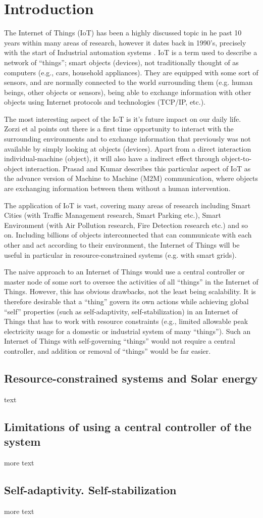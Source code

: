 \documentclass[../main/Self-Stabilization.tex]{subfiles}
\begin{document}
\section{Introduction}
The Internet of Things (IoT) has been a highly discussed topic in he past 10 years within many areas of research, however it dates back in 1990's, precisely with the start of Industrial automation systems \cite{prasad2012energy}. IoT is a term used to describe a network of ``things''; smart objects (devices), not traditionally thought of as computers (e.g., cars, household appliances). They are equipped with some sort of sensors, and are normally connected to the world surrounding them (e.g. human beings, other objects or sensors), being able to exchange information with other objects using Internet protocols and technologies (TCP/IP, etc.).

The most interesting aspect of the IoT is it's future impact on our daily life. Zorzi et al \cite{zorzi2010today} points out there is a first time opportunity to interact with the surrounding environments and to exchange information that previously was not available by simply looking at objects (devices). Apart from a direct interaction individual-machine (object), it will also have a indirect effect through object-to-object interaction. Prasad and Kumar \cite{prasad2012energy} describes this particular aspect of IoT as the advance version of Machine to Machine (M2M) communication, where objects are exchanging information between them without a human intervention.

The application of IoT is vast, covering many areas of research including Smart Cities (with Traffic Management research, Smart Parking etc.), Smart Environment (with Air Pollution research, Fire Detection research etc.) and so on. Including billions of objects interconnected that can communicate with each other and act according to their environment, the Internet of Things will be useful in particular in resource-constrained systems (e.g. with smart grids).

The naive approach to an Internet of Things would use a central controller or master node of some sort to oversee the activities of all ``things'' in the Internet of Things.  However, this has obvious drawbacks, not the least being scalability. It is therefore desirable that a ``thing'' govern its own actions while achieving global ``self'' properties (such as self-adaptivity, self-stabilization) in an Internet of Things that has to work with resource constraints (e.g., limited allowable peak electricity usage for a domestic or industrial system of many ``things''). Such an Internet of Things with self-governing ``things'' would not require a central controller, and addition or removal of ``things'' would be far easier.


\subsection{Resource-constrained systems and Solar energy}
text
\subsection{Limitations of using a central controller of the system}
more text
\subsection{Self-adaptivity. Self-stabilization}
more text
\end{document}
